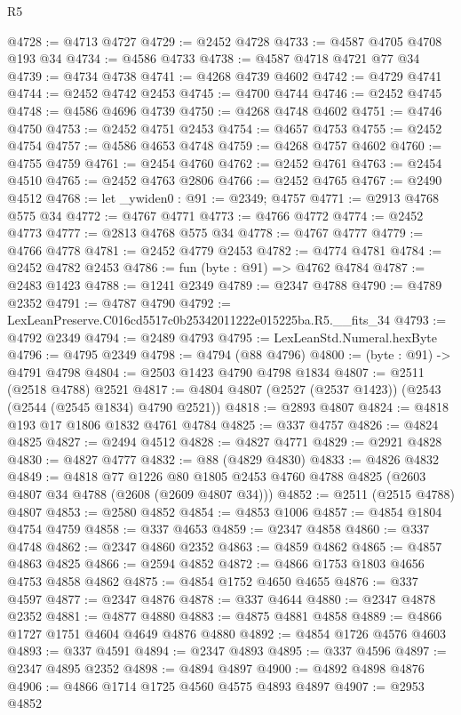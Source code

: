 \begin{lexlean}{R5}
\begin{coremodule}
@4728 := @4713 @4727
@4729 := @2452 @4728
@4733 := @4587 @4705 @4708 @193 @34
@4734 := @4586 @4733
@4738 := @4587 @4718 @4721 @77 @34
@4739 := @4734 @4738
@4741 := @4268 @4739 @4602
@4742 := @4729 @4741
@4744 := @2452 @4742 @2453
@4745 := @4700 @4744
@4746 := @2452 @4745
@4748 := @4586 @4696 @4739
@4750 := @4268 @4748 @4602
@4751 := @4746 @4750
@4753 := @2452 @4751 @2453
@4754 := @4657 @4753
@4755 := @2452 @4754
@4757 := @4586 @4653 @4748
@4759 := @4268 @4757 @4602
@4760 := @4755 @4759
@4761 := @2454 @4760
@4762 := @2452 @4761
@4763 := @2454 @4510
@4765 := @2452 @4763 @2806
@4766 := @2452 @4765
@4767 := @2490 @4512
@4768 := let _ywiden0 : @91 := @2349; @4757
@4771 := @2913 @4768 @575 @34
@4772 := @4767 @4771
@4773 := @4766 @4772
@4774 := @2452 @4773
@4777 := @2813 @4768 @575 @34
@4778 := @4767 @4777
@4779 := @4766 @4778
@4781 := @2452 @4779 @2453
@4782 := @4774 @4781
@4784 := @2452 @4782 @2453
@4786 := fun (byte : @91) => @4762 @4784
@4787 := @2483 @1423
@4788 := @1241 @2349
@4789 := @2347 @4788
@4790 := @4789 @2352
@4791 := @4787 @4790
@4792 := LexLeanPreserve.C016cd5517c0b25342011222e015225ba.R5.__fits_34
@4793 := @4792 @2349
@4794 := @2489 @4793
@4795 := LexLeanStd.Numeral.hexByte
@4796 := @4795 @2349
@4798 := @4794 (@88 @4796)
@4800 := (byte : @91) -> @4791 @4798
@4804 := @2503 @1423 @4790 @4798 @1834
@4807 := @2511 (@2518 @4788) @2521
@4817 := @4804 @4807 (@2527 (@2537 @1423)) (@2543 (@2544 (@2545 @1834) @4790 @2521))
@4818 := @2893 @4807
@4824 := @4818 @193 @17 @1806 @1832 @4761 @4784
@4825 := @337 @4757
@4826 := @4824 @4825
@4827 := @2494 @4512
@4828 := @4827 @4771
@4829 := @2921 @4828
@4830 := @4827 @4777
@4832 := @88 (@4829 @4830)
@4833 := @4826 @4832
@4849 := @4818
    @77
    @1226
    @80
    @1805
    @2453
    @4760
    @4788
    @4825
    (@2603 @4807 @34 @4788 (@2608 (@2609 @4807 @34)))
@4852 := @2511 (@2515 @4788) @4807
@4853 := @2580 @4852
@4854 := @4853 @1006
@4857 := @4854 @1804 @4754 @4759
@4858 := @337 @4653
@4859 := @2347 @4858
@4860 := @337 @4748
@4862 := @2347 @4860 @2352
@4863 := @4859 @4862
@4865 := @4857 @4863 @4825
@4866 := @2594 @4852
@4872 := @4866 @1753 @1803 @4656 @4753 @4858 @4862
@4875 := @4854 @1752 @4650 @4655
@4876 := @337 @4597
@4877 := @2347 @4876
@4878 := @337 @4644
@4880 := @2347 @4878 @2352
@4881 := @4877 @4880
@4883 := @4875 @4881 @4858
@4889 := @4866 @1727 @1751 @4604 @4649 @4876 @4880
@4892 := @4854 @1726 @4576 @4603
@4893 := @337 @4591
@4894 := @2347 @4893
@4895 := @337 @4596
@4897 := @2347 @4895 @2352
@4898 := @4894 @4897
@4900 := @4892 @4898 @4876
@4906 := @4866 @1714 @1725 @4560 @4575 @4893 @4897
@4907 := @2953 @4852

\end{coremodule}
\end{lexlean}
